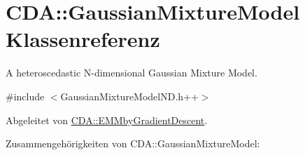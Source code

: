 \hypertarget{classCDA_1_1GaussianMixtureModel}{
\section{CDA::GaussianMixtureModel Klassenreferenz}
\label{classCDA_1_1GaussianMixtureModel}
}


A heteroscedastic N-\/dimensional Gaussian Mixture Model.  




{\ttfamily \#include $<$GaussianMixtureModelND.h++$>$}



Abgeleitet von \hyperlink{classCDA_1_1EMMbyGradientDescent}{CDA::EMMbyGradientDescent}.



Zusammengehörigkeiten von CDA::GaussianMixtureModel:\nopagebreak
